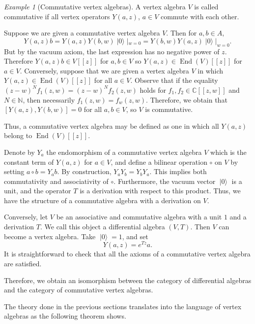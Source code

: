 \documentclass[a4paper, 12pt, reqno]{amsart}
\theoremstyle{remark}
\newtheorem{example}[theorem]{Example}
\numberwithin{equation}{subsection}
\DeclareMathOperator{\End}{End}
\DeclareMathOperator{\vac}{|0\rangle}
\begin{document}
\begin{example}[Commutative vertex algebras]
  \label{exa:4}
  A vertex algebra $V$ is called commutative if all vertex operators $Y(a, z)$, $a \in V$ commute with each other.
  
  Suppose we are given a commutative vertex algebra $V$.
  Then for $a, b \in A$,
  \begin{equation*}
    Y(a, z)b = Y(a, z)Y(b, w)\vac|_{w = 0} = Y(b, w)Y(a, z)\vac|_{w = 0}.
  \end{equation*}
  But by the vacuum axiom, the last expression has no negative power of $z$.
  Therefore $Y(a, z)b \in V[[z]]$ for $a, b \in V$ so $Y(a, z) \in \End(V)[[z]]$ for $a \in V$.
  Conversely, suppose that we are given a vertex algebra $V$ in which $Y(a, z) \in \End(V)[[z]]$ for all $a \in V$.
  Observe that if the equality $(z - w)^Nf_1(z, w) = (z - w)^Nf_2(z, w)$ holds for $f_1, f_2 \in \mathbb{C}[[z, w]]$ and $N \in \mathbb{N}$, then necessarily $f_1(z, w) = f_w(z, w)$.
  Therefore, we obtain that $[Y(a, z), Y(b, w)] = 0$ for all $a, b \in V$, so $V$ is commutative.
  
  Thus, a commutative vertex algebra may be defined as one in which all $Y(a, z)$ belong to $\End(V)[[z]]$.

  Denote by $Y_a$ the endomorphism of a commutative vertex algebra $V$ which is the constant term of $Y(a, z)$ for $a \in V$, and define a bilinear operation $\circ$ on $V$ by setting $a\circ b=Y_ab$.
  By construction, $Y_aY_b = Y_bY_a$.
  This implies both commutativity and associativity of $\circ$.
  Furthermore, the vacuum vector $\vac$ is a unit, and the operator $T$ is a derivation with respect to this product.
  Thus, we have the structure of a commutative algebra with a derivation on $V$.

  Conversely, let $V$ be an associative and commutative algebra with a unit $1$ and a derivation $T$.
  We call this object a differential algebra $(V, T)$.
  Then $V$ can become a vertex algebra.
  Take $\vac = 1$, and set
  \begin{equation*}
    Y(a, z) = e^{Tz}a.
  \end{equation*}
  It is straightforward to check that all the axioms of a commutative vertex algebra are satisfied.

  Therefore, we obtain an isomorphism between the category of differential algebras and the category of commutative vertex algebras.
\end{example}

The theory done in the previous sections translates into the language of vertex algebras as the following theorem shows.
\end{document}
